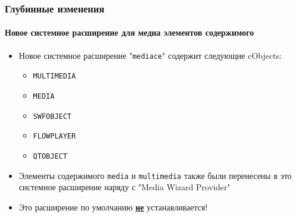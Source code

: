 \begin{frame}[fragile]
	\frametitle{Глубинные изменения}
	\framesubtitle{Новое системное расширение для медиа элементов содержимого}

	\begin{itemize}

		\item Новое системное расширение "\texttt{mediace}" содержит следующие cObjects:

			\begin{itemize}
				\item \texttt{MULTIMEDIA}
				\item \texttt{MEDIA}
				\item \texttt{SWFOBJECT}
				\item \texttt{FLOWPLAYER}
				\item \texttt{QTOBJECT}
			\end{itemize}

		\item Элементы содержимого \texttt{media} и \texttt{multimedia} также были перенесены в
			это системное расширение наряду с "Media Wizard Provider"

		\item Это расширение по умолчанию \underline{\textbf{не}} устанавливается!

	\end{itemize}

\end{frame}

